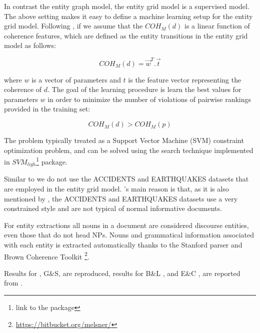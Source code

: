 In contrast the entity graph model, the entity grid model is a supervised model. 
The above setting makes it easy to define a machine learning setup for the entity grid model. 
Following , if we assume that the $COH_M(d)$ is a linear function of coherence features, which are defined as the entity transitions in the entity grid model as follows:

\begin{equation}
COH_M(d) = \vec{w}^{T}.\vec{t}
\end{equation}

where $w$ is a vector of parameters and $t$ is the feature vector representing the coherence of $d$. 
The goal of the learning procedure is learn the best values for parameters $w$ in order to minimize the number of violations of pairwise rankings provided in the training set:

\begin{equation}
COH_M(d) > COH_M(p)
\end{equation}

The problem typically treated as a Support Vector Machine (SVM) constraint optimization problem, and can be solved using the search technique implemented in $SVM_{ligh}$\footnote{link to the package} \cite{joachims02} package. 

Similar to  we do not use the ACCIDENTS and EARTHQUAKES datasets that are employed in the entity grid model. 
's main reason is that, as  it is also mentioned by , the ACCIDENTS and EARTHQUAKES datasets use a very constrained style and are not typical of normal informative documents. 


For entity extractions all nouns in a document are considered discourse entities, even those that do not head NPs.
Nouns and grammatical information associated with each entity is extracted automatically thanks to the Stanford parser \cite{marneffe06} and Brown Coherence Toolkit \footnote{\url{https://bitbucket.org/melsner/}}. 



Results for , G\&S, are reproduced, results for 
B\&L , and E\&C ,  are reported from . 


